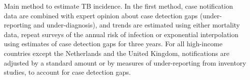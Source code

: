 \label{fig:incmethods}Main method to estimate TB incidence. In the first method, case notification data are combined with expert opinion about case detection gaps (under-reporting and under-diagnosis), and trends are estimated using either mortality data, repeat surveys of the annual risk of infection or exponential interpolation using estimates of case detection gaps for three years. For all high-income countries except the Netherlands and the United Kingdom, notifications are adjusted by a standard amount or by measures of under-reporting from inventory studies, to account for case detection gaps. 